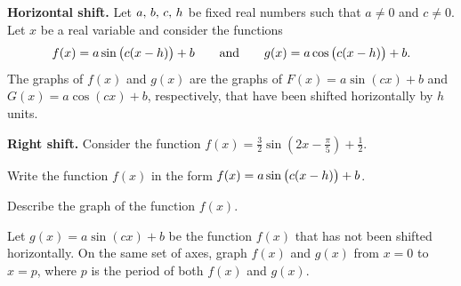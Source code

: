 \documentclass[a4paper,oneside,12pt]{article}
\begin{document}

\begin{definition}
\label{def:trigonometric:horizontal_shift}
\textbf{Horizontal shift.}
Let ${a},\, {b},\, {c},\, {h}$ be fixed real numbers such that
$a \neq 0$ and $c \neq 0$.  Let $x$ be a real variable and consider
the functions
\[
f(x)
=
a \sin\big(c (x - h)\big) + b
\qquad
\text{and}
\qquad
g(x)
=
a \cos\big(c (x - h)\big) + b.
\]
The graphs of $f(x)$ and $g(x)$ are the graphs of
$F(x) = a \sin(cx) + b$ and $G(x) = a \cos(cx) + b$, respectively,
that have been shifted horizontally by $h$ units.
\end{definition}

\begin{example}
\textbf{Right shift.}
Consider the function
$f(x) = \frac{3}{2} \sin(2x - \frac{\pi}{5}) + \frac{1}{2}$.
\begin{packedenum}
\item\label{subeg:trigonometric:sin_horizontal_shift_standard_form}
  Write the function $f(x)$ in the form
  $f(x) = a \sin\big(c (x - h)\big) + b$.

\item\label{subeg:trigonometric:sin_horizontal_shift_describe}
  Describe the graph of the function $f(x)$.

\item\label{subeg:trigonometric:sin_horizontal_shift_graph_unshifted}
  Let $g(x) = a \sin(cx) + b$ be the function $f(x)$ that has not been
  shifted horizontally.  On the same set of axes, graph $f(x)$ and
  $g(x)$ from $x = 0$ to $x = p$, where $p$ is the period of both
  $f(x)$ and $g(x)$.
\end{packedenum}
\end{example}
\end{document}
